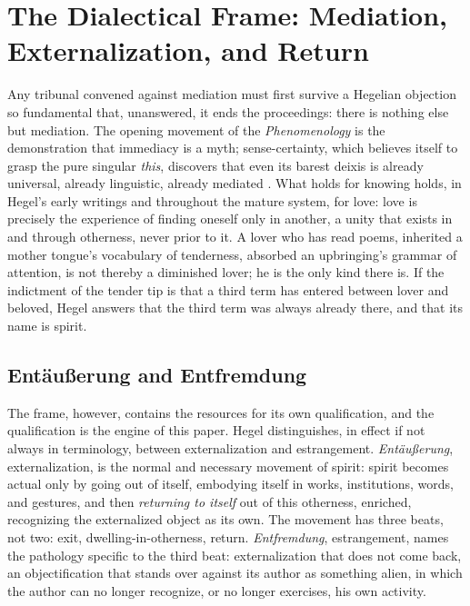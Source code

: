 \documentclass[11pt,a4paper]{article}
\newcommand{\term}[1]{\textit{\textcolor{pinkitalic}{#1}}}
\begin{document}
\section{The Dialectical Frame: Mediation, Externalization, and Return}
\label{p02:sec:hegel}

Any tribunal convened against mediation must first survive a Hegelian objection so fundamental that, unanswered, it ends the proceedings: there is nothing else but mediation. The opening movement of the \emph{Phenomenology} is the demonstration that immediacy is a myth; sense-certainty, which believes itself to grasp the pure singular \emph{this}, discovers that even its barest deixis is already universal, already linguistic, already mediated \parencite{hegel1807phenomenology}. What holds for knowing holds, in Hegel's early writings and throughout the mature system, for love: love is precisely the experience of finding oneself only in another, a unity that exists in and through otherness, never prior to it. A lover who has read poems, inherited a mother tongue's vocabulary of tenderness, absorbed an upbringing's grammar of attention, is not thereby a diminished lover; he is the only kind there is. If the indictment of the tender tip is that a third term has entered between lover and beloved, Hegel answers that the third term was always already there, and that its name is spirit.

\subsection{Ent\"au{\ss}erung and Entfremdung}
\label{p02:sec:hegel-distinction}

The frame, however, contains the resources for its own qualification, and the qualification is the engine of this paper. Hegel distinguishes, in effect if not always in terminology, between externalization and estrangement. \term{Ent\"au{\ss}erung}, externalization, is the normal and necessary movement of spirit: spirit becomes actual only by going out of itself, embodying itself in works, institutions, words, and gestures, and then \emph{returning to itself} out of this otherness, enriched, recognizing the externalized object as its own. The movement has three beats, not two: exit, dwelling-in-otherness, return. \term{Entfremdung}, estrangement, names the pathology specific to the third beat: externalization that does not come back, an objectification that stands over against its author as something alien, in which the author can no longer recognize, or no longer exercises, his own activity.
\end{document}

